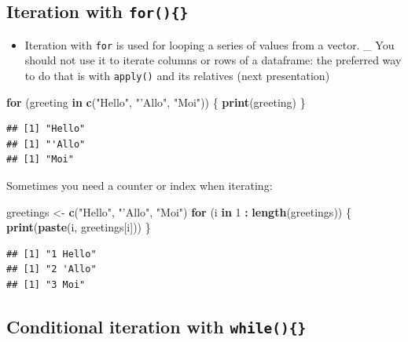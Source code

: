 \documentclass[]{book}
\newenvironment{Shaded}{\begin{snugshade}}{\end{snugshade}}
\newcommand{\ControlFlowTok}[1]{\textcolor[rgb]{0.13,0.29,0.53}{\textbf{#1}}}
\newcommand{\DecValTok}[1]{\textcolor[rgb]{0.00,0.00,0.81}{#1}}
\newcommand{\KeywordTok}[1]{\textcolor[rgb]{0.13,0.29,0.53}{\textbf{#1}}}
\newcommand{\NormalTok}[1]{#1}
\newcommand{\OperatorTok}[1]{\textcolor[rgb]{0.81,0.36,0.00}{\textbf{#1}}}
\newcommand{\StringTok}[1]{\textcolor[rgb]{0.31,0.60,0.02}{#1}}
\providecommand{\tightlist}{%
  \setlength{\itemsep}{0pt}\setlength{\parskip}{0pt}}
\begin{document}
\hypertarget{iteration-with-for}{%
\subsection{\texorpdfstring{Iteration with \texttt{for()\{\}}}{Iteration with for()\{\}}}\label{iteration-with-for}}

\begin{itemize}
\tightlist
\item
  Iteration with \texttt{for} is used for looping a series of values from a vector.
  \_ You should not use it to iterate columns or rows of a dataframe: the preferred way to do that is with \texttt{apply()} and its relatives (next presentation)
\end{itemize}

\begin{Shaded}
\begin{Highlighting}[]
\ControlFlowTok{for}\NormalTok{ (greeting }\ControlFlowTok{in} \KeywordTok{c}\NormalTok{(}\StringTok{"Hello"}\NormalTok{, }\StringTok{"'Allo"}\NormalTok{, }\StringTok{"Moi"}\NormalTok{)) \{}
    \KeywordTok{print}\NormalTok{(greeting)}
\NormalTok{\}}
\end{Highlighting}
\end{Shaded}

\begin{verbatim}
## [1] "Hello"
## [1] "'Allo"
## [1] "Moi"
\end{verbatim}

Sometimes you need a counter or index when iterating:

\begin{Shaded}
\begin{Highlighting}[]
\NormalTok{greetings <-}\StringTok{ }\KeywordTok{c}\NormalTok{(}\StringTok{"Hello"}\NormalTok{, }\StringTok{"'Allo"}\NormalTok{, }\StringTok{"Moi"}\NormalTok{)}
\ControlFlowTok{for}\NormalTok{ (i }\ControlFlowTok{in} \DecValTok{1} \OperatorTok{:}\StringTok{ }\KeywordTok{length}\NormalTok{(greetings)) \{}
    \KeywordTok{print}\NormalTok{(}\KeywordTok{paste}\NormalTok{(i, greetings[i]))}
\NormalTok{\}}
\end{Highlighting}
\end{Shaded}

\begin{verbatim}
## [1] "1 Hello"
## [1] "2 'Allo"
## [1] "3 Moi"
\end{verbatim}

\hypertarget{conditional-iteration-with-while}{%
\subsection{\texorpdfstring{Conditional iteration with \texttt{while()\{\}}}{Conditional iteration with while()\{\}}}\label{conditional-iteration-with-while}}
\end{document}
